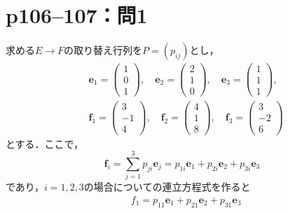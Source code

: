 \documentclass[a4paper,10pt,fleqn]{ltjsarticle}
\begin{document}
\section*{p106--107：問1}
\begin{leftbar}
    求める$E\to F$の取り替え行列を$P=(p_{ij})$とし，
    \begin{align*}
         & \bm{e}_1=
        \begin{pmatrix}
            1 \\
            0 \\
            1
        \end{pmatrix}
        ,\quad
        \bm{e}_2=
        \begin{pmatrix}
            2 \\
            1 \\
            0
        \end{pmatrix}
        ,\quad
        \bm{e}_3=
        \begin{pmatrix}
            1 \\
            1 \\
            1
        \end{pmatrix}
        ,            \\
         &
        \bm{f}_1=
        \begin{pmatrix}
            3  \\
            -1 \\
            4
        \end{pmatrix}
        ,\quad
        \bm{f}_2=
        \begin{pmatrix}
            4 \\
            1 \\
            8
        \end{pmatrix}
        ,\quad
        \bm{f}_3=
        \begin{pmatrix}
            3  \\
            -2 \\
            6
        \end{pmatrix}
    \end{align*}
    とする．ここで，
    \[
        \bm{f}_i=\sum^{3}_{j=1}p_{ji}\bm{e}_{j}=p_{1i}\bm{e}_1+p_{2i}\bm{e}_2+p_{3i}\bm{e}_3
    \]
    であり，$i=1,2,3$の場合についての連立方程式を作ると
    \begin{align*}
         & f_1=p_{11}\bm{e}_1+p_{21}\bm{e}_2+p_{31}\bm{e}_3 \\

\end{align*}
\end{leftbar}
\end{document}
